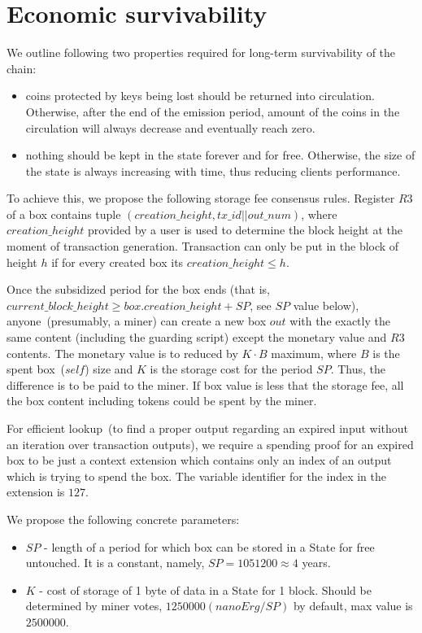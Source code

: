 \section{Economic survivability}

We outline following two properties required for long-term survivability of the chain:

\begin{itemize}
    \item{} coins protected by keys being lost should be returned into circulation.
    Otherwise, after the end of the emission period, amount of the coins
    in the circulation will always decrease and eventually reach zero.
    \item{} nothing should be kept in the state forever and for free.
    Otherwise, the size of the state is always increasing with time, thus reducing clients performance.
\end{itemize}

To achieve this, we propose the following storage fee consensus rules.
Register $R3$ of a box contains tuple $(creation\_height, tx\_id || out\_num)$, where $creation\_height$ provided by a user
is used to determine the block height at the moment of transaction generation.
Transaction can only be put in the block of height $h$ if for every created box its $creation\_height \le h$.

Once the subsidized period for the box ends (that is,
$current\_block\_height \ge box.creation\_height + SP$, see $SP$ value below), anyone~(presumably, a miner) can
create a new box $out$ with the exactly the same content (including the guarding
script) except the monetary value and $R3$ contents. The monetary value is to
reduced by $K \cdot B$ maximum, where $B$ is the spent box~($self$)
size and $K$ is the storage cost for the period $SP$. Thus, the difference is to be paid to the miner.
If box value is less that the storage fee, all the box content including tokens could be spent by the miner.

For efficient lookup~(to find a proper output regarding an expired input without an iteration over transaction outputs),
we require a spending proof for an expired box to be just a context extension which contains only an index of an
output which is trying to spend the box. The variable identifier for the index in the extension is $127$.

We propose the following concrete parameters:
\begin{itemize}
    \item{} $SP$ - length of a period for which box can be stored in a State for free untouched.
    It is a constant, namely, $SP = 1051200 \approx 4$ years.
    \item{} $K$ - cost of storage of 1 byte of data in a State for 1 block.
    Should be determined by miner votes, $1250000 (nanoErg/SP)$ by default, max value is $2500000$.
\end{itemize}

